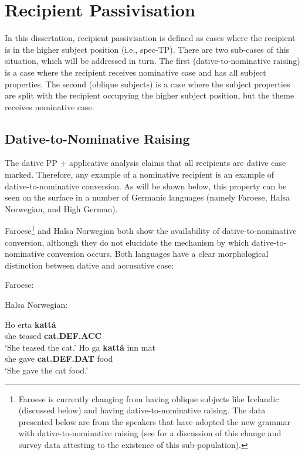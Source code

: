 \section{Recipient Passivisation}
In this dissertation, recipient passivisation is defined as cases where the recipient is in the higher subject position (i.e., spec-TP). There are two sub-cases of this situation, which will be addressed in turn. The first (dative-to-nominative raising) is a case where the recipient receives nominative case and has all subject properties. The second (oblique subjects) is a case where the subject properties are split with the recipient occupying the higher subject position, but the theme receives nominative case.

\subsection{Dative-to-Nominative Raising}

The dative PP + applicative analysis claims that all recipients are dative case marked. Therefore, any example of a nominative recipient is an example of dative-to-nominative conversion. As will be shown below, this property can be seen on the surface in a number of Germanic languages (namely Faroese, Halsa Norwegian, and High German). 

Faroese\footnote{Faroese is currently changing from having oblique subjects like Icelandic (discussed below) and having dative-to-nominative raising. The data presented below are from the speakers that have adopted the new grammar with dative-to-nominative raising (see \cite{Eyorsson.2012} for a discussion of this change and survey data attesting to the existence of this sub-population).} and Halsa Norwegian both show the availability of dative-to-nominative conversion, although they do not elucidate the mechanism by which dative-to-nominative conversion occurs. Both languages have a clear morphological distinction between dative and accusative case:

\begin{exe}
	\ex Faroese:\label{ex:far-case}
		\begin{xlist}
		\end{xlist}
		\ex Halsa Norwegian:\label{ex:halsa-case}
	\begin{xlist}
		\ex \gll Ho erta \textbf{katt\aa} \\
		she teased \textbf{cat.DEF.ACC} \\
			\trans `She teased the cat.'
			\ex \gll Ho ga \textbf{katt\aa} inn mat \\
			she gave \textbf{cat.DEF.DAT} food \\
			\trans `She gave the cat food.'
	\end{xlist}
\end{exe}

